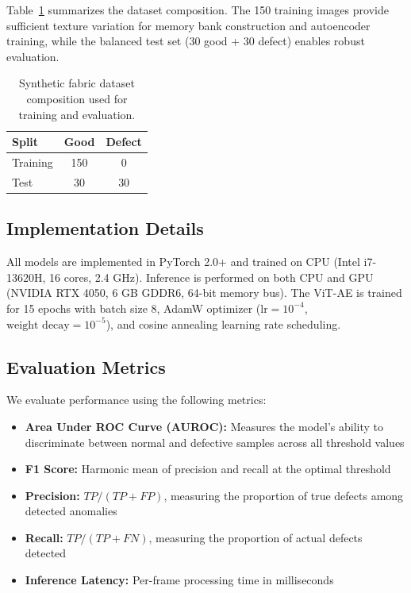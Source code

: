 \documentclass[journal]{IEEEtran}
\begin{document}
Table~\ref{tab:dataset} summarizes the dataset composition. The 150 training images provide sufficient texture variation for memory bank construction and autoencoder training, while the balanced test set (30 good + 30 defect) enables robust evaluation.

\begin{table}[t]
\centering
\caption{Synthetic fabric dataset composition used for training and evaluation.}
\label{tab:dataset}
\begin{tabular}{lcc}
\toprule
\textbf{Split} & \textbf{Good} & \textbf{Defect} \\
\midrule
Training & 150 & 0 \\
Test & 30 & 30 \\
\bottomrule
\end{tabular}
\end{table}

\subsection{Implementation Details}

All models are implemented in PyTorch 2.0+ and trained on CPU (Intel i7-13620H, 16 cores, 2.4 GHz). Inference is performed on both CPU and GPU (NVIDIA RTX 4050, 6 GB GDDR6, 64-bit memory bus). The ViT-AE is trained for 15 epochs with batch size 8, AdamW optimizer ($\text{lr}=10^{-4}$, $\text{weight decay}=10^{-5}$), and cosine annealing learning rate scheduling.

\subsection{Evaluation Metrics}

We evaluate performance using the following metrics:

\begin{itemize}[nosep]
    \item \textbf{Area Under ROC Curve (AUROC):} Measures the model's ability to discriminate between normal and defective samples across all threshold values
    \item \textbf{F1 Score:} Harmonic mean of precision and recall at the optimal threshold
    \item \textbf{Precision:} $TP / (TP + FP)$, measuring the proportion of true defects among detected anomalies
    \item \textbf{Recall:} $TP / (TP + FN)$, measuring the proportion of actual defects detected
    \item \textbf{Inference Latency:} Per-frame processing time in milliseconds
\end{itemize}
\end{document}
